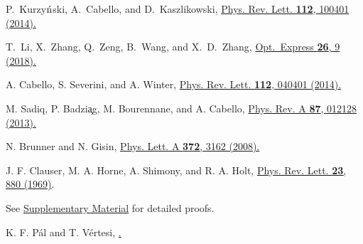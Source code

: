 \documentclass[prl,letterpaper,english,reprint,nofootinbib,aps,superscriptaddress,showpacs,showkeys]{revtex4-1}
\theoremstyle{definition}
\theoremstyle{remark}
\begin{document}
\begin{thebibliography}{10}
P.~Kurzy${\rm \acute{n}}$ski, A.~Cabello, and D.~Kaszlikowski,
 \href{https://journals.aps.org/prl/pdf/10.1103/PhysRevLett.112.100401}
{Phys. Rev. Lett. \textbf{112}, 100401 (2014).}


T.~Li, X.~Zhang, Q.~Zeng, B.~Wang, and X.~D.~Zhang,
\href{https://www.osapublishing.org/DirectPDFAccess/75609127-9CAD-CE26-93F0FBF2C26787E3_385890/oe-26-9-11959.pdf?da=1&id=385890&seq=0&mobile=no}
{Opt.~Express \textbf{26}, 9 (2018).}





 A. Cabello, S. Severini, and A. Winter,
 \href{http://journals.aps.org/prl/abstract/10.1103/PhysRevLett.112.040401}{Phys. Rev. Lett. \textbf{112}, 040401 (2014).}


 M. Sadiq, P. Badzi{\c a}g, M. Bourennane, and A. Cabello,
 \href{http://pra.aps.org/abstract/PRA/v87/i1/e012128}{Phys. Rev. A \textbf{87}, 012128 (2013).}

 N. Brunner and N. Gisin,
 \href{http://dx.doi.org/10.1016/j.physleta.2008.01.052}{Phys. Lett. A \textbf{372}, 3162 (2008).}


J. F. Clauser, M. A. Horne, A. Shimony, and R. A. Holt,
\href{https://journals.aps.org/prl/abstract/10.1103/PhysRevLett.23.880}{Phys. Rev. Lett. \textbf{23}, 880 (1969)}.


See \href{https://journals.aps.org/} {Supplementary Material} for detailed proofs.


 K. F. P\'al and T. V\'ertesi,
 \href{https://dx.doi.org/10.1103/PhysRevA.82.022116}{.}











\end{thebibliography}
\end{document}
